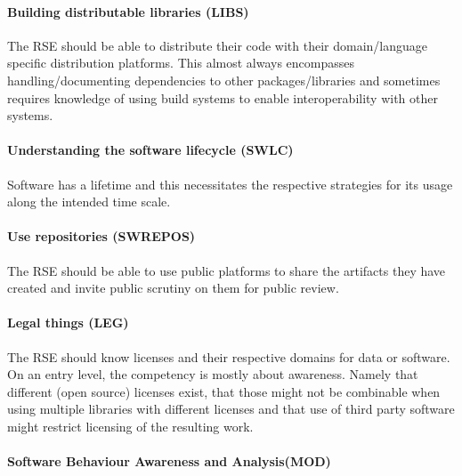 \documentclass[a4paper
]{article}
\begin{document}
\hypertarget{building-distributable-libraries-libs}{%
\paragraph{Building distributable libraries
(LIBS)}\label{building-distributable-libraries-libs}}

The RSE should be able to distribute their code with their
domain/language specific distribution platforms. This almost always
encompasses handling/documenting dependencies to other
packages/libraries and sometimes requires knowledge of using build
systems to enable interoperability with other systems.

\hypertarget{understanding-the-software-lifecycle-swlc}{%
\paragraph{Understanding the software lifecycle
(SWLC)}\label{understanding-the-software-lifecycle-swlc}}

Software has a lifetime and this necessitates the respective strategies
for its usage along the intended time scale.

\hypertarget{use-repositories-swrepos}{%
\paragraph{Use repositories (SWREPOS)}\label{use-repositories-swrepos}}

The RSE should be able to use public platforms to share the artifacts
they have created and invite public scrutiny on them for public review.

\hypertarget{legal-things-leg}{%
\paragraph{Legal things (LEG)}\label{legal-things-leg}}

The RSE should know licenses and their respective domains for data or
software. On an entry level, the competency is mostly about awareness.
Namely that different (open source) licenses exist, that those might not
be combinable when using multiple libraries with different licenses and
that use of third party software might restrict licensing of the
resulting work.

\hypertarget{software-behaviour-awareness-and-analysismod}{%
\paragraph{Software Behaviour Awareness and
Analysis(MOD)}\label{software-behaviour-awareness-and-analysismod}}
\end{document}
